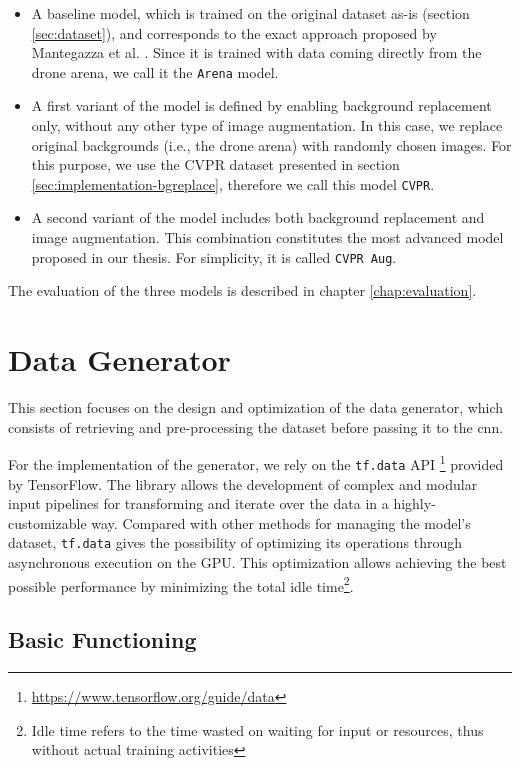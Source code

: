 \begin{itemize}
    \item A baseline model, which is trained on the original dataset as-is (section \ref{sec:dataset}), and corresponds to the exact approach proposed by Mantegazza et al. \cite{mantegazza2019visionbased}. Since it is trained with data coming directly from the drone arena, we call it the \texttt{Arena} model.
    \item A first variant of the model is defined by enabling background replacement only, without any other type of image augmentation. In this case, we replace original backgrounds (i.e., the drone arena) with randomly chosen images. For this purpose, we use the CVPR dataset presented in section \ref{sec:implementation-bgreplace}, therefore we call this model \texttt{CVPR}.
    \item A second variant of the model includes both background replacement and image augmentation. This combination constitutes the most advanced model proposed in our thesis. For simplicity, it is called \texttt{CVPR Aug}.
\end{itemize}

The evaluation of the three models is described in chapter \ref{chap:evaluation}.




\section{Data Generator}
\label{sec:data-generator}

This section focuses on the design and optimization of the data generator, which consists of retrieving and pre-processing the dataset before passing it to the \gls{cnn}.

For the implementation of the generator, we rely on the \texttt{tf.data} API \footnote{\url{https://www.tensorflow.org/guide/data}} provided by TensorFlow. The library allows the development of complex and modular input pipelines for transforming and iterate over the data in a highly-customizable way. Compared with other methods for managing the model's dataset, \texttt{tf.data} gives the possibility of optimizing its operations through asynchronous execution on the GPU. This optimization allows achieving the best possible performance by minimizing the total idle time\footnote{Idle time refers to the time wasted on waiting for input or resources, thus without actual training activities}.



\subsection{Basic Functioning}
\label{subsec:data-generator-basic}

